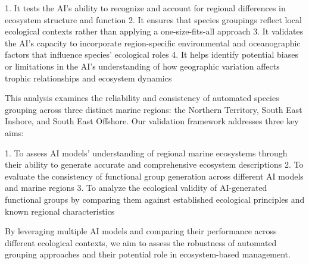 1. It tests the AI's ability to recognize and account for regional differences in ecosystem structure and function
2. It ensures that species groupings reflect local ecological contexts rather than applying a one-size-fits-all approach
3. It validates the AI's capacity to incorporate region-specific environmental and oceanographic factors that influence species' ecological roles
4. It helps identify potential biases or limitations in the AI's understanding of how geographic variation affects trophic relationships and ecosystem dynamics

This analysis examines the reliability and consistency of automated species grouping across three distinct marine regions: the Northern Territory, South East Inshore, and South East Offshore. Our validation framework addresses three key aims:

1. To assess AI models' understanding of regional marine ecosystems through their ability to generate accurate and comprehensive ecosystem descriptions
2. To evaluate the consistency of functional group generation across different AI models and marine regions
3. To analyze the ecological validity of AI-generated functional groups by comparing them against established ecological principles and known regional characteristics

By leveraging multiple AI models and comparing their performance across different ecological contexts, we aim to assess the robustness of automated grouping approaches and their potential role in ecosystem-based management.
